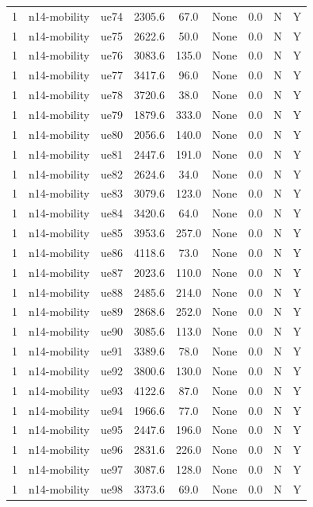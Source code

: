 \begin{table}[ht]
\begin{tabular}{|c|c|c|c|c|c|c|c|c|}
1 & n14-mobility & ue74 & 2305.6 & 67.0 & None & 0.0 & N & Y \\
1 & n14-mobility & ue75 & 2622.6 & 50.0 & None & 0.0 & N & Y \\
1 & n14-mobility & ue76 & 3083.6 & 135.0 & None & 0.0 & N & Y \\
1 & n14-mobility & ue77 & 3417.6 & 96.0 & None & 0.0 & N & Y \\
1 & n14-mobility & ue78 & 3720.6 & 38.0 & None & 0.0 & N & Y \\
1 & n14-mobility & ue79 & 1879.6 & 333.0 & None & 0.0 & N & Y \\
1 & n14-mobility & ue80 & 2056.6 & 140.0 & None & 0.0 & N & Y \\
1 & n14-mobility & ue81 & 2447.6 & 191.0 & None & 0.0 & N & Y \\
1 & n14-mobility & ue82 & 2624.6 & 34.0 & None & 0.0 & N & Y \\
1 & n14-mobility & ue83 & 3079.6 & 123.0 & None & 0.0 & N & Y \\
1 & n14-mobility & ue84 & 3420.6 & 64.0 & None & 0.0 & N & Y \\
1 & n14-mobility & ue85 & 3953.6 & 257.0 & None & 0.0 & N & Y \\
1 & n14-mobility & ue86 & 4118.6 & 73.0 & None & 0.0 & N & Y \\
1 & n14-mobility & ue87 & 2023.6 & 110.0 & None & 0.0 & N & Y \\
1 & n14-mobility & ue88 & 2485.6 & 214.0 & None & 0.0 & N & Y \\
1 & n14-mobility & ue89 & 2868.6 & 252.0 & None & 0.0 & N & Y \\
1 & n14-mobility & ue90 & 3085.6 & 113.0 & None & 0.0 & N & Y \\
1 & n14-mobility & ue91 & 3389.6 & 78.0 & None & 0.0 & N & Y \\
1 & n14-mobility & ue92 & 3800.6 & 130.0 & None & 0.0 & N & Y \\
1 & n14-mobility & ue93 & 4122.6 & 87.0 & None & 0.0 & N & Y \\
1 & n14-mobility & ue94 & 1966.6 & 77.0 & None & 0.0 & N & Y \\
1 & n14-mobility & ue95 & 2447.6 & 196.0 & None & 0.0 & N & Y \\
1 & n14-mobility & ue96 & 2831.6 & 226.0 & None & 0.0 & N & Y \\
1 & n14-mobility & ue97 & 3087.6 & 128.0 & None & 0.0 & N & Y \\
1 & n14-mobility & ue98 & 3373.6 & 69.0 & None & 0.0 & N & Y \\

\end{tabular}
\end{table}
